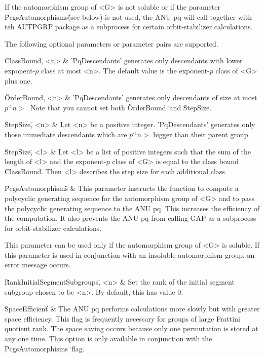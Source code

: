 If  the automorphism  group of  <G> is  not soluble  or if  the parameter
\"PcgsAutomorphisms\" (see below) is not  used, the ANU pq will call {\GAP}
together  with   teh  AUTPGRP  package   as  a  subprocess   for  certain
orbit-stabilizer calculations.

The following optional parameters or parameter pairs are supported.

\beginitems
\"ClassBound\", <n> &
    'PqDescendants' generates  only  descendants  with lower exponent-$p$
    class  at most  <n>.  The default value is  the exponent-$p$ class of
    <G> plus one.

\"OrderBound\", <n> &
    'PqDescendants' generates only descendants of  size at  most $p^<n>$.
    Note that you cannot set both \"OrderBound\"\ and \"StepSize\".

\"StepSize\", <n> &
    Let <n> be a  positive integer.  'PqDescendants' generates only those
    immediate  descendants  which are $p^<n>$  bigger  than  their parent
    group.

\"StepSize\", <l> &
    Let <l> be a  list of  positive  integers such that  the  sum  of the
    length of <l> and the exponent-$p$ class of <G> is equal to the class
    bound \"ClassBound\".  Then  <l> describes  the  step size  for  each
    additional class.

\"PcgsAutomorphisms\" &
    This  parameter  instructs  the  function  to  compute  a  polycyclic
    generating sequence for the automorphism group of <G> and to pass the
    polycyclic  generating sequence to  the ANU  pq.  This  increases the
    efficiency  of the  computation.  It  also prevents  the ANU  pq from
    calling GAP as a subprocess for orbit-stabilizer calculations.

    This parameter can  be used only if the automorphism  group of <G> is
    soluble.  If this parameter is  used in conjunction with an insoluble
    automorphism group, an error message occurs.

\"RankInitialSegmentSubgroups\", <n> &
    Set the rank  of the  initial  segment  subgroup chosen to  be <n>.
    By default, this has value 0.

\"SpaceEfficient\" &
    The ANU  pq performs  calculations  more slowly but with greater space
    efficiency.
    This  flag is  frequently  necessary  for  groups of  large  Frattini
    quotient rank.  The space  saving occurs because only one permutation
    is  stored at  any  one  time.   This option  is  only  available  in
    conjunction with the \"PcgsAutomorphisms\"\ flag.

